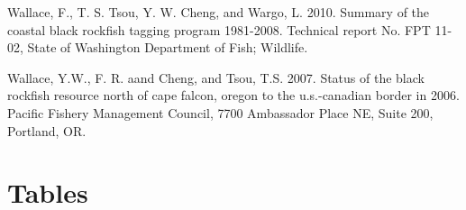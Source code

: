 \documentclass[11pt,
  english,
  letterpaper,
]{article}
\newlength{\cslhangindent}
\newenvironment{CSLReferences}[2] %
 {%
  \setlength{\parindent}{0pt}
  \ifodd #1 \everypar{\setlength{\hangindent}{\cslhangindent}}\ignorespaces\fi
  \ifnum #2 > 0
  \setlength{\parskip}{#2\baselineskip}
  \fi
 }%
 {}
\begin{document}
\begin{CSLReferences}{1}{0}
\leavevmode{}%
Wallace, F., T. S. Tsou, Y. W. Cheng, and Wargo, L. 2010. Summary of the coastal black rockfish tagging program 1981-2008. Technical report No. FPT 11-02, State of Washington Department of Fish; Wildlife.

\leavevmode{}%
Wallace, Y.W., F. R. aand Cheng, and Tsou, T.S. 2007. Status of the black rockfish resource north of cape falcon, oregon to the u.s.-canadian border in 2006. Pacific Fishery Management Council, 7700 Ambassador Place NE, Suite 200, Portland, OR.

\end{CSLReferences}

\clearpage

\hypertarget{tables}{%
\section{Tables}\label{tables}}





















\newpage



\pagebreak

\begingroup\fontsize{9}{11}\selectfont
\end{document}
